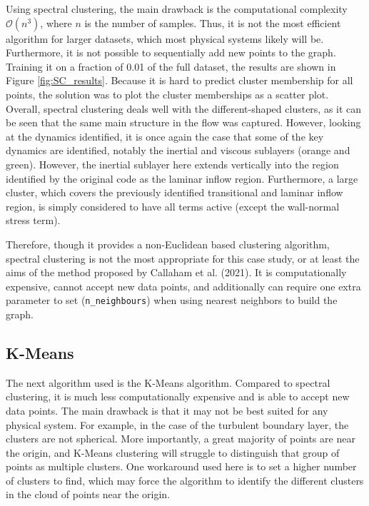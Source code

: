 \documentclass[12pt]{report} %
\begin{document}
Using spectral clustering, the main drawback is the computational complexity $\mathcal{O}(n^3)$, where $n$ is the number of samples. Thus, it is not the most efficient algorithm for larger datasets, which most physical systems likely will be. Furthermore, it is not possible to sequentially add new points to the graph. Training it on a fraction of 0.01 of the full dataset, the results are shown in Figure \ref{fig:SC_results}. Because it is hard to predict cluster membership for all points, the solution was to plot the cluster memberships as a scatter plot. Overall, spectral clustering deals well with the different-shaped clusters, as it can be seen that the same main structure in the flow was captured. However, looking at the dynamics identified, it is once again the case that some of the key dynamics are identified, notably the inertial and viscous sublayers (orange and green). However, the inertial sublayer here extends vertically into the region identified by the original code as the laminar inflow region. Furthermore, a large cluster, which covers the previously identified transitional and laminar inflow region, is simply considered to have all terms active (except the wall-normal stress term).

Therefore, though it provides a non-Euclidean based clustering algorithm, spectral clustering is not the most appropriate for this case study, or at least the aims of the method proposed by Callaham et al. (2021)\cite{callaham2021learning}. It is computationally expensive, cannot accept new data points, and additionally can require one extra parameter to set (\texttt{n\_neighbours}) when using nearest neighbors to build the graph.


\subsection{K-Means}

The next algorithm used is the K-Means algorithm. Compared to spectral clustering, it is much less computationally expensive and is able to accept new data points. The main drawback is that it may not be best suited for any physical system. For example, in the case of the turbulent boundary layer, the clusters are not spherical. More importantly, a great majority of points are near the origin, and K-Means clustering will struggle to distinguish that group of points as multiple clusters. One workaround used here is to set a higher number of clusters to find, which may force the algorithm to identify the different clusters in the cloud of points near the origin.
\end{document}
